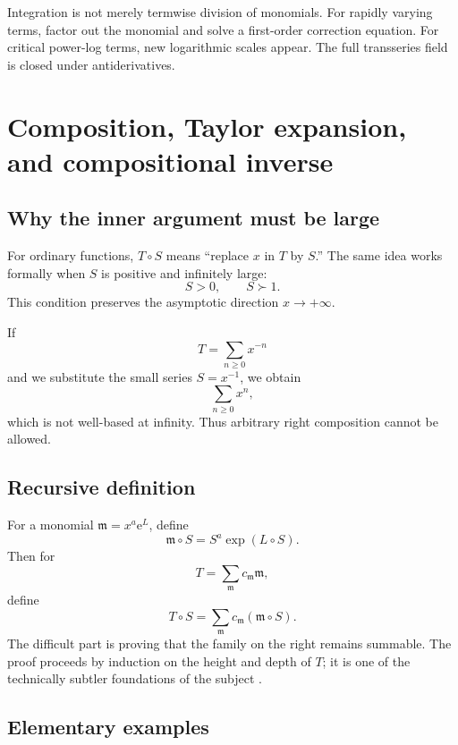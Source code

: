 \documentclass[11pt,oneside]{book}
\theoremstyle{definition}
\theoremstyle{remark}
\newcommand{\m}{\mathfrak{m}}
\newcommand{\e}{\mathrm{e}}
\newcommand{\succdom}{\succ}
\newcommand{\compose}{\mathbin{\circ}}
\begin{document}
\begin{summarybox}
Integration is not merely termwise division of monomials. For rapidly varying
terms, factor out the monomial and solve a first-order correction equation. For
critical power-log terms, new logarithmic scales appear. The full transseries
field is closed under antiderivatives.
\end{summarybox}


\chapter{Composition, Taylor expansion, and compositional inverse}
\label{ch:composition}

\section{Why the inner argument must be large}

For ordinary functions, $T\compose S$ means ``replace $x$ in $T$ by $S$.'' The
same idea works formally when $S$ is positive and infinitely large:
\[
  S>0,\qquad S\succdom1.
\]
This condition preserves the asymptotic direction $x\to+\infty$.

If
\[
  T=\sum_{n\ge0}x^{-n}
\]
and we substitute the small series $S=x^{-1}$, we obtain
\[
  \sum_{n\ge0}x^n,
\]
which is not well-based at infinity. Thus arbitrary right composition cannot be
allowed.

\section{Recursive definition}

For a monomial $\m=x^a\e^L$, define
\begin{equation}
  \m\compose S=S^a\exp(L\compose S).
  \label{eq:monomial-composition}
\end{equation}
Then for
\[
  T=\sum_{\m}c_{\m}\m,
\]
define
\begin{equation}
  T\compose S=\sum_{\m}c_{\m}(\m\compose S).
  \label{eq:series-composition}
\end{equation}
The difficult part is proving that the family on the right remains summable. The
proof proceeds by induction on the height and depth of $T$; it is one of the
technically subtler foundations of the subject
\cite{EdgarComposition,vanDerHoevenBook,BerarducciMantovaGerms}.

\section{Elementary examples}
\end{document}
